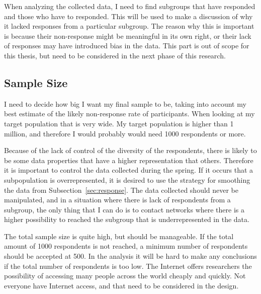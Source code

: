       When analyzing the collected data, I need to find subgroups that have responded and those who have to responded. This will be used to make a discussion of why it lacked responses from a particular subgroup. The reason why this is important is because their non-response might be meaningful in its own right, or their lack of responses may have introduced bias in the data. This part is out of scope for this thesis, but need to be considered in the next phase of this research.
    
    \subsection{Sample Size} \label{sec:samplesize}

      I need to decide how big I want my final sample to be, taking into account my best estimate of the likely non-response rate of participants. When looking at my target population that is very wide. My target population is higher than 1 million, and therefore I would probably would need 1000 respondents or more.

      Because of the lack of control of the diversity of the respondents, there is likely to be some data properties that have a higher representation that others. Therefore it is important to control the data collected during the spring. If it occurs that a subpopulation is overrepresented, it is desired to use the strategy for smoothing the data from Subsection~\ref{sec:response}. The data collected should never be manipulated, and in a situation where there is lack of respondents from a subgroup, the only thing that I can do is to contact networks where there is a higher possibility to reached the subgroup that is underrepresented in the data.

      The total sample size is quite high, but should be manageable. If the total amount of 1000 respondents is not reached, a minimum number of respondents should be accepted at 500. In the analysis it will be hard to make any conclusions if the total number of respondents is too low.  The Internet offers researchers the possibility of accessing many people across the world cheaply and quickly. Not everyone have Internet access, and that need to be considered in the design.
